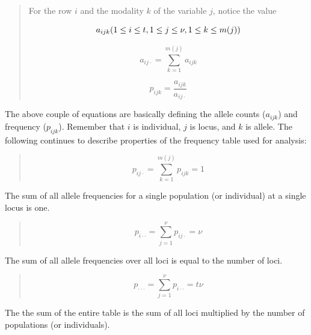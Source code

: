 \documentclass[letterpaper]{article}\usepackage[]{graphicx}\usepackage[]{color}
\begin{document}
\begin{quote}
For the row $i$ and the modality $k$ of the variable $j$, notice the value

\begin{equation}
  a_{ijk}\\ (1 \leq i \leq t,\\ 1 \leq j \leq \nu,\\ 1 \leq k \leq m(j))
\end{equation}

\begin{equation}
  a_{ij\cdot}=\sum_{k=1}^{m(j)}a_{ijk} 
\end{equation}

\begin{equation}
  p_{ijk}=\frac{a_{ijk}}{a_{ij\cdot}}
\end{equation}
\end{quote}

The above couple of equations are basically defining the allele counts
($a_{ijk}$) and frequency ($p_{ijk}$). Remember that $i$ is individual, $j$ is
locus, and $k$ is allele. The following continues to describe properties of the
frequency table used for analysis:

\begin{quote}
\begin{equation}
 p_{ij\cdot}=\sum_{k=1}^{m(j)}p_{ijk}=1
\end{equation}
\end{quote}
The sum of all allele frequencies for a single population (or individual) at a 
single locus is one.

\begin{quote}
\begin{equation}
p_{i{\cdot}\cdot}=\sum_{j=1}^{\nu}p_{ij\cdot}=\nu
\end{equation}
\end{quote}
The sum of all allele frequencies over all loci is equal to the number of loci.

\begin{quote} 
\begin{equation}
p_{{\cdot}{\cdot}\cdot}=\sum_{j=1}^{\nu}p_{i{\cdot}\cdot}=t\nu
\end{equation}
\end{quote}
The the sum of the entire table is the sum of all loci multiplied by the number 
of populations (or individuals).


\end{document}
